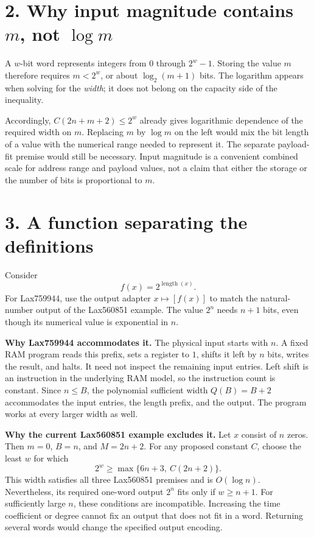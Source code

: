 \documentclass[11pt,a4paper]{article}
\begin{document}
\newpage
\section*{2. Why input magnitude contains $m$, not $\log m$}

A $w$-bit word represents integers from $0$ through $2^w-1$. Storing the
value $m$ therefore requires $m<2^w$, or about $\log_2(m+1)$ bits. The
logarithm appears when solving for the \emph{width}; it does not belong on
the capacity side of the inequality.

Accordingly, $C(2n+m+2)\le 2^w$ already gives logarithmic dependence of
the required width on $m$. Replacing $m$ by $\log m$ on the left would mix
the bit length of a value with the numerical range needed to represent it.
The separate payload-fit premise would still be necessary. Input magnitude
is a convenient combined scale for address range and payload values, not a
claim that either the storage or the number of bits is proportional to $m$.

\section*{3. A function separating the definitions}

Consider
\[
  f(x)=2^{\operatorname{length}(x)}.
\]
For Lax759944, use the output adapter $x\mapsto[f(x)]$ to match the natural-number
output of the Lax560851 example. The value $2^n$ needs $n+1$ bits, even though its
numerical value is exponential in $n$.

\textbf{Why Lax759944 accommodates it.}
The physical input starts with $n$. A fixed RAM program reads this prefix,
sets a register to $1$, shifts it left by $n$ bits, writes the result, and
halts. It need not inspect the remaining input entries. Left shift is an
instruction in the underlying RAM model, so the instruction count is constant.
Since $n\le B$, the polynomial sufficient width $Q(B)=B+2$ accommodates
the input entries, the length prefix, and the output. The program works at
every larger width as well.

\textbf{Why the current Lax560851 example excludes it.}
Let $x$ consist of $n$ zeros. Then $m=0$, $B=n$, and $M=2n+2$.
For any proposed constant $C$, choose the least $w$ for which
\[
  2^w\ge \max\{6n+3,\ C(2n+2)\}.
\]
This width satisfies all three Lax560851 premises and is $O(\log n)$.
Nevertheless, its required one-word output $2^n$ fits only if $w\ge n+1$.
For sufficiently large $n$, these conditions are incompatible. Increasing
the time coefficient or degree cannot fix an output that does not fit in a
word. Returning several words would change the specified output encoding.
\end{document}
